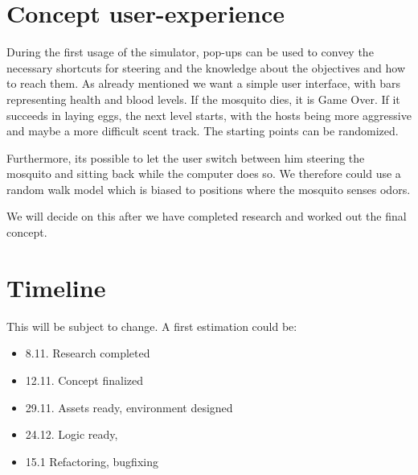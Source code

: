\documentclass{acm_proc_article-sp}
\begin{document}
\section{Concept user-experience}
During the first usage of the simulator, pop-ups can be used to convey the necessary shortcuts for steering and the knowledge about the objectives and how to reach them. As already mentioned we want a simple user interface, with bars representing health and blood levels. If the mosquito dies, it is Game Over. If it succeeds in laying eggs, the next level starts, with the hosts being more aggressive and maybe a more difficult scent track. The starting points can be randomized.

Furthermore, its possible to let the user switch between him steering the mosquito and sitting back while the computer does so. We therefore could use a random walk model which is biased to positions where the mosquito senses odors.

We will decide on this after we have completed research and worked out the final concept.


\section{Timeline}
This will be subject to change. A first estimation could be:

\begin{itemize}
	\item	8.11. Research completed
	\item 12.11. Concept finalized
	\item 29.11. Assets ready, environment designed
	\item 24.12. Logic ready,
	\item 15.1	Refactoring, bugfixing
\end{itemize}








%

%
%

\balancecolumns
\end{document}
